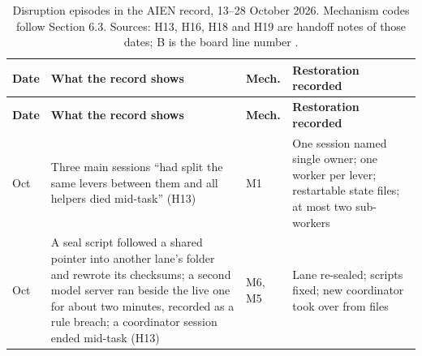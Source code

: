 \documentclass[11pt]{article}
\begin{document}
\begin{longtable}[]{@{}
  >{\raggedright\arraybackslash}p{}
  >{\raggedright\arraybackslash}p{}
  >{\raggedright\arraybackslash}p{}
  >{\raggedright\arraybackslash}p{}@{}}
\caption{Disruption episodes in the AIEN record, 13--28 October 2026. Mechanism codes follow Section 6.3. Sources: H13, H16, H18 and H19 are handoff notes of those dates; B is the board line number \cite{oprecord}.}\tabularnewline
\toprule\noalign{}
\begin{minipage}[b]{\linewidth}\raggedright
\textbf{Date}
\end{minipage} & \begin{minipage}[b]{\linewidth}\raggedright
\textbf{What the record shows}
\end{minipage} & \begin{minipage}[b]{\linewidth}\raggedright
\textbf{Mech.}
\end{minipage} & \begin{minipage}[b]{\linewidth}\raggedright
\textbf{Restoration recorded}
\end{minipage} \\
\midrule\noalign{}
\endfirsthead
\toprule\noalign{}
\begin{minipage}[b]{\linewidth}\raggedright
\textbf{Date}
\end{minipage} & \begin{minipage}[b]{\linewidth}\raggedright
\textbf{What the record shows}
\end{minipage} & \begin{minipage}[b]{\linewidth}\raggedright
\textbf{Mech.}
\end{minipage} & \begin{minipage}[b]{\linewidth}\raggedright
\textbf{Restoration recorded}
\end{minipage} \\
\midrule\noalign{}
\endhead
\bottomrule\noalign{}
\endlastfoot
13 Oct & Three main sessions ``had split the same levers between them and all helpers died mid-task'' (H13) & M1 & One session named single owner; one worker per lever; restartable state files; at most two sub-workers \\
14 Oct & A seal script followed a shared pointer into another lane's folder and rewrote its checksums; a second model server ran beside the live one for about two minutes, recorded as a rule breach; a coordinator session ended mid-task (H13) & M6, M5 & Lane re-sealed; scripts fixed; new coordinator took over from files \\

\end{longtable}
\end{document}
